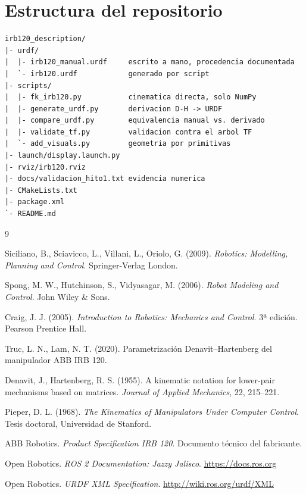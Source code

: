 \documentclass[11pt,a4paper]{article}
\begin{document}
\section{Estructura del repositorio}

\begin{lstlisting}[caption={Organización de archivos}]
irb120_description/
|- urdf/
|  |- irb120_manual.urdf     escrito a mano, procedencia documentada
|  `- irb120.urdf            generado por script
|- scripts/
|  |- fk_irb120.py           cinematica directa, solo NumPy
|  |- generate_urdf.py       derivacion D-H -> URDF
|  |- compare_urdf.py        equivalencia manual vs. derivado
|  |- validate_tf.py         validacion contra el arbol TF
|  `- add_visuals.py         geometria por primitivas
|- launch/display.launch.py
|- rviz/irb120.rviz
|- docs/validacion_hito1.txt evidencia numerica
|- CMakeLists.txt
|- package.xml
`- README.md
\end{lstlisting}

\begin{thebibliography}{9}

Siciliano, B., Sciavicco, L., Villani, L., Oriolo, G. (2009).
\emph{Robotics: Modelling, Planning and Control}. Springer-Verlag London.

Spong, M. W., Hutchinson, S., Vidyasagar, M. (2006).
\emph{Robot Modeling and Control}. John Wiley \& Sons.

Craig, J. J. (2005). \emph{Introduction to Robotics: Mechanics and
Control}. 3ª edición. Pearson Prentice Hall.

Truc, L. N., Lam, N. T. (2020). Parametrización Denavit--Hartenberg del
manipulador ABB IRB 120.

Denavit, J., Hartenberg, R. S. (1955). A kinematic notation for
lower-pair mechanisms based on matrices. \emph{Journal of Applied
Mechanics}, 22, 215--221.

Pieper, D. L. (1968). \emph{The Kinematics of Manipulators Under
Computer Control}. Tesis doctoral, Universidad de Stanford.

ABB Robotics. \emph{Product Specification IRB 120}. Documento técnico
del fabricante.

Open Robotics. \emph{ROS 2 Documentation: Jazzy Jalisco}.
\url{https://docs.ros.org}

Open Robotics. \emph{URDF XML Specification}.
\url{http://wiki.ros.org/urdf/XML}

\end{thebibliography}
\end{document}
